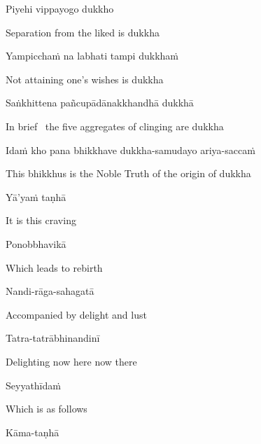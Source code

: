 Piyehi vippayogo dukkho

\begin{english}
  Separation from the liked is dukkha
\end{english}

Yampicchaṁ na labhati tampi dukkhaṁ

\begin{english}
  Not attaining one's wishes is dukkha
\end{english}

Saṅkhittena pañcupādānakkhandhā dukkhā

\begin{english}
  In brief \breathmark\ the five aggregates of clinging are dukkha\makeatletter\hyperlink{endnote54-appendix}\makeatother
\end{english}

Idaṁ kho pana bhikkhave dukkha-samudayo ariya-saccaṁ

\begin{english}
  This bhikkhus is the Noble Truth of the origin of dukkha
\end{english}

Yā'yaṁ taṇhā

\begin{english}
  It is this craving
\end{english}

Ponobbhavikā

\begin{english}
  Which leads to rebirth
\end{english}

Nandi-rāga-sahagatā

\begin{english}
  Accompanied by delight and lust
\end{english}

Tatra-tatrābhinandinī

\begin{english}
  Delighting now here now there
\end{english}

Seyyathīdaṁ

\begin{english}
  Which is as follows
\end{english}

Kāma-taṇhā

